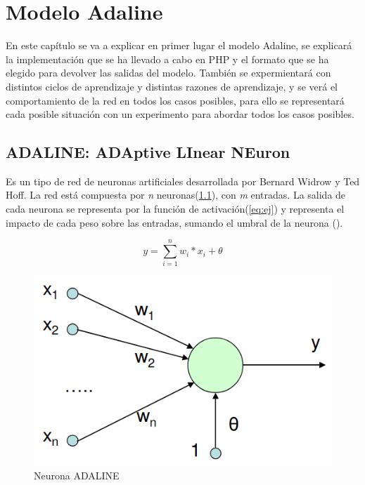 \documentclass[11pt,spanish,listoffigures,listoftables]{workluis}
\begin{document}
\chapter{Modelo Adaline}

\par En este capítulo se va a explicar en primer lugar el modelo Adaline, se explicará la implementación que se ha llevado a cabo en PHP y el formato que se ha elegido para devolver las salidas del modelo. También se expermientará con distintos ciclos de aprendizaje y distintas razones de aprendizaje, y se verá el comportamiento de la red en todos los casos posibles, para ello se representará cada posible situación con un experimento para abordar todos los casos posibles.

\section{ADALINE: ADAptive LInear NEuron}

\par Es un tipo de red de neuronas artificiales desarrollada por Bernard Widrow y Ted Hoff. La red está compuesta por \textit{n} neuronas(\ref{fig:adaline}), con \textit{m} entradas. La salida de cada neurona se representa por la función de activación(\ref{eq:ej}) y representa el impacto de cada peso sobre las entradas, sumando el umbral de la neurona (\theta).

\begin{equation}\label{eq:ej}
y = \sum_{i=1}^{n}w_{i}*x_{i} + \theta
\end{equation}

\begin{figure}
\centering
\includegraphics[scale=0.5]{adaline}
\caption{Neurona ADALINE \cite{Adaline}}\label{fig:adaline}
\end{figure}
\end{document}
